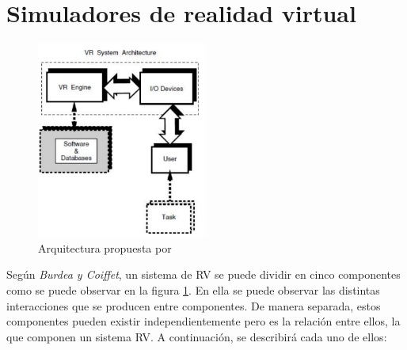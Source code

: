 \section{Simuladores de realidad virtual}
\label{art:simulador}

\begin{figure}[h]
   \centering
    \includegraphics[width=0.5\textwidth]{IMG/VRarq.PNG}
    \caption{Arquitectura propuesta por \cite{burdea2003virtual} }
   \label{fig:RVarq}
\end{figure}
Según \emph{Burdea y Coiffet}\cite{burdea2003virtual}, un sistema de \ac{RV} se puede dividir en cinco componentes  como se puede observar en la figura \ref{fig:RVarq}. En ella se puede observar las distintas interacciones que se producen entre  componentes. De manera separada, estos componentes pueden existir independientemente pero es la relación  entre ellos, la que componen un sistema  \ac{RV}. A continuación, se describirá cada uno de ellos:
